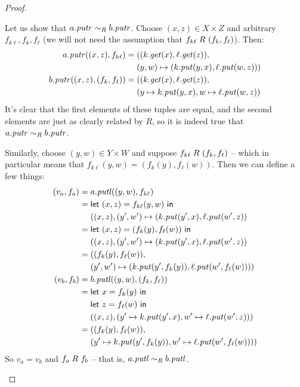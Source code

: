 \begin{defn}[$R$-similarity]
\begin{theorem}
\begin{lemma}
\begin{theorem}[No products]
\begin{lemma}
\begin{defn}
\begin{theorem}
\begin{theorem}
\begin{corollary}[Hylomorphism]
\begin{defn}
\begin{defn}
\begin{defn}[Symmetrization]
\begin{proof}
\begin{longenum}
Let us show that $a.\mathit{putr} \sim_R b.\mathit{putr}$. Choose $(x,z) \in X \times Z$ and
arbitrary $f_{k\ell},f_k,f_\ell$ (we will not need the assumption that
$f_{k\ell} \mathrel{R_{}} (f_k,f_\ell)$). Then:
\begin{align*}
    a.\mathit{putr}((x,z),f_{k\ell}) ={}
    & ((k.\mathit{get}(x),\ell.\mathit{get}(z)), \\
    & (y,w) \mapsto (k.\mathit{put}(y,x),\ell.\mathit{put}(w,z))) \\
    b.\mathit{putr}((x,z),(f_k,f_\ell)) ={}
    & ((k.\mathit{get}(x),\ell.\mathit{get}(z)), \\
    & (y \mapsto k.\mathit{put}(y,x),w \mapsto \ell.\mathit{put}(w,z))
\end{align*}
It's clear that the first elements of these tuples are equal, and the second
elements are just as clearly related by $R$, so it is indeed true that
$a.\mathit{putr} \sim_R b.\mathit{putr}$.

Similarly, choose $(y,w) \in Y \times W$ and suppose $f_{k\ell} \mathrel{R_{}}
(f_k,f_\ell)$ -- which in particular means that
$f_{k\ell}(y,w)=(f_k(y),f_\ell(w))$. Then we can define a few things:
\begin{align*}
    (v_a,f_a) ={}
    & a.\mathit{putl}((y,w),f_{k\ell}) \\
    ={}
    & \mathsf{let}\  (x,z) = f_{k\ell}(y,w) \ \mathsf{in} \\
    & ((x,z), (y',w') \mapsto (k.\mathit{put}(y',x),\ell.\mathit{put}(w',z)) \\
    ={}
    & \mathsf{let}\  (x,z) = (f_k(y),f_\ell(w)) \ \mathsf{in} \\
    & ((x,z), (y',w') \mapsto (k.\mathit{put}(y',x),\ell.\mathit{put}(w',z)) \\
    ={}
    & ((f_k(y),f_\ell(w)), \\
    & (y',w') \mapsto (k.\mathit{put}(y',f_k(y)),\ell.\mathit{put}(w',f_\ell(w)))) \\
    (v_b,f_b) ={}
    & b.\mathit{putl}((y,w),(f_k,f_\ell)) \\
    ={}
    & \mathsf{let}\  x = f_k(y) \ \mathsf{in} \\
    & \mathsf{let}\  z = f_\ell(w) \ \mathsf{in} \\
    & ((x,z),(y' \mapsto k.\mathit{put}(y',x),w' \mapsto \ell.\mathit{put}(w',z))) \\
    ={}
    & ((f_k(y),f_\ell(w)), \\
    & (y' \mapsto k.\mathit{put}(y',f_k(y)),w' \mapsto \ell.\mathit{put}(w',f_\ell(w))))
\end{align*}
So $v_a=v_b$ and $f_a \mathrel{R_{}} f_b$ -- that is, $a.\mathit{putl} \sim_R b.\mathit{putl}$.


\end{longenum}
\end{proof}
\end{defn}
\end{defn}
\end{defn}
\end{corollary}
\end{theorem}
\end{theorem}
\end{defn}
\end{lemma}
\end{theorem}
\end{lemma}
\end{theorem}
\end{defn}
